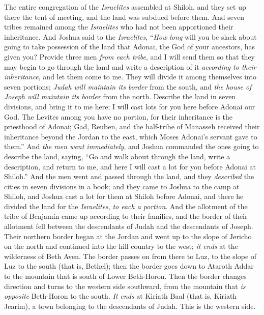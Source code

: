 \begin{biblechapter} %
 The entire congregation of the \textit{Israelites} assembled at Shiloh, and they set up there the tent of meeting, and the land was subdued before them.
\verse And seven tribes remained among the \textit{Israelites} who had not been apportioned their inheritance.
\verse And Joshua said to the \textit{Israelites}, “\textit{How long} will you be slack about going to take possession of the land that Adonai, the God of your ancestors, has given you?
\verse Provide three men \textit{from each tribe}, and I will send them so that they may begin to go through the land and write a description of it \textit{according to their inheritance}, and let them come to me.
\verse They will divide it among themselves into seven portions; \textit{Judah will maintain its border} from the south, and \textit{the house of Joseph will maintain its border} from the north.
\verse Describe the land in seven divisions, and bring it to me here; I will cast lots for you here before Adonai our God.
\verse The Levites among you have no portion, for their inheritance is the priesthood of Adonai; Gad, Reuben, and the half-tribe of Manasseh received their inheritance beyond the Jordan to the east, which Moses Adonai’s servant gave to them.”
\verse And \textit{the men went immediately}, and Joshua commanded the ones going to describe the land, saying, “Go and walk about through the land, write a description, and return to me, and here I will cast a lot for you before Adonai at Shiloh.”
\verse And the men went and passed through the land, and they \textit{described} the cities in seven divisions in a book; and they came to Joshua to the camp at Shiloh,
\verse and Joshua cast a lot for them at Shiloh before Adonai, and there he divided the land for the \textit{Israelites}, \textit{to each a portion}.
 And the allotment of the tribe of Benjamin came up according to their families, and the border of their allotment fell between the descendants of Judah and the descendants of Joseph.
\verse Their northern border began at the Jordan and went up to the slope of Jericho on the north and continued into the hill country to the west; \textit{it ends} at the wilderness of Beth Aven.
\verse The border passes on from there to Luz, to the slope of Luz to the south (that is, Bethel); then the border goes down to Ataroth Addar to the mountain that is south of Lower Beth-Horon.
\verse Then the border changes direction and turns to the western side southward, from the mountain that \textit{is opposite} Beth-Horon to the south. \textit{It ends} at Kiriath Baal (that is, Kiriath Jearim), a town belonging to the descendants of Judah. This is the western side.

\end{biblechapter}
